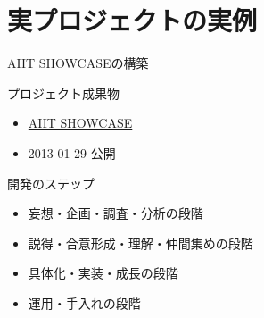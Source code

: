 \documentclass[dvipdfmx]{beamer}
\begin{document}
\section{実プロジェクトの実例}
\label{sec-3}
\begin{frame}[label=sec-3-1]{AIIT SHOWCASEの構築}
\begin{block}{プロジェクト成果物}
\begin{itemize}
\item \href{http://showcase.aiit.ac.jp/}{AIIT SHOWCASE}
\item 2013-01-29 公開
\end{itemize}
\end{block}

\begin{block}{開発のステップ}
\begin{itemize}
\item 妄想・企画・調査・分析の段階
\item 説得・合意形成・理解・仲間集めの段階
\item 具体化・実装・成長の段階
\item 運用・手入れの段階
\end{itemize}
\end{block}
\end{frame}
\end{document}
